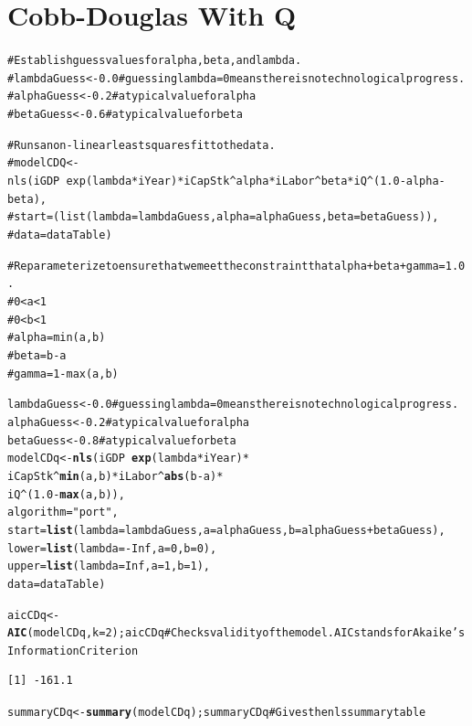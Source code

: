\documentclass[preprint,authoryear,12pt]{elsarticle}\usepackage{graphicx, color}
\makeatletter
\newcommand{\hlfunctioncall}[1]{\textcolor[rgb]{0.501960784313725,0,0.329411764705882}{\textbf{#1}}}%
\newcommand{\hlstring}[1]{\textcolor[rgb]{0.6,0.6,1}{#1}}%
\newcommand{\hlcomment}[1]{\textcolor[rgb]{0.180392156862745,0.6,0.341176470588235}{#1}}%
\newenvironment{kframe}{%
 \def\at@end@of@kframe{}%
 \ifinner\ifhmode%
  \def\at@end@of@kframe{\end{minipage}}%
  \begin{minipage}{\columnwidth}%
 \fi\fi%
 \def\FrameCommand##1{\hskip\@totalleftmargin \hskip-\fboxsep
 \colorbox{shadecolor}{##1}\hskip-\fboxsep
     \hskip-\linewidth \hskip-\@totalleftmargin \hskip\columnwidth}%
 \MakeFramed {\advance\hsize-\width
   \@totalleftmargin\z@ \linewidth\hsize
   \@setminipage}}%
 {\par\unskip\endMakeFramed%
 \at@end@of@kframe}
\newenvironment{knitrout}{}{} %
\makeatother
\begin{document}
\section{Cobb-Douglas With Q}

\begin{knitrout}
\color{fgcolor}\begin{kframe}
\begin{alltt}
\hlcomment{# Establish guess values for alpha, beta, and lambda.}
\hlcomment{# lambdaGuess <- 0.0 # guessing lambda = 0 means there is no technological progress.}
\hlcomment{# alphaGuess <- 0.2 # a typical value for alpha}
\hlcomment{# betaGuess <- 0.6 # a typical value for beta}

\hlcomment{# Runs a non-linear least squares fit to the data.}
\hlcomment{# modelCDQ <- nls(iGDP ~ exp(lambda*iYear) * iCapStk^alpha * iLabor^beta * iQ^(1.0 - alpha - beta), }
\hlcomment{#                 start=(list(lambda=lambdaGuess,alpha=alphaGuess,beta=betaGuess)),}
\hlcomment{#                 data=dataTable)}

\hlcomment{# Reparameterize to ensure that we meet the constraint that alpha + beta + gamma = 1.0.}
\hlcomment{# 0 < a < 1}
\hlcomment{# 0 < b < 1}
\hlcomment{# alpha = min(a, b)}
\hlcomment{# beta = b - a}
\hlcomment{# gamma = 1 - max(a, b)}

lambdaGuess <- 0.0 \hlcomment{# guessing lambda = 0 means there is no technological progress.}
alphaGuess <- 0.2 \hlcomment{# a typical value for alpha}
betaGuess <- 0.8 \hlcomment{# a typical value for beta}
modelCDq <- \hlfunctioncall{nls}(iGDP ~ \hlfunctioncall{exp}(lambda*iYear) * 
                            iCapStk^\hlfunctioncall{min}(a,b) * iLabor^\hlfunctioncall{abs}(b-a) * 
                            iQ^(1.0 - \hlfunctioncall{max}(a,b)), 
  algorithm = \hlstring{"port"},
  start = \hlfunctioncall{list}(lambda=lambdaGuess, a=alphaGuess, b=alphaGuess+betaGuess),
	lower = \hlfunctioncall{list}(lambda=-Inf, a=0, b=0),
	upper = \hlfunctioncall{list}(lambda=Inf, a=1, b=1),
  data = dataTable)

aicCDq <- \hlfunctioncall{AIC}(modelCDq, k=2); aicCDq \hlcomment{# Checks validity of the model. AIC stands for Akaike's Information Criterion}
\end{alltt}
\begin{verbatim}
[1] -161.1
\end{verbatim}
\begin{alltt}

summaryCDq <- \hlfunctioncall{summary}(modelCDq); summaryCDq \hlcomment{# Gives the nls summary table}
\end{alltt}
\begin{verbatim}


\end{verbatim}
\end{kframe}
\end{knitrout}
\end{document}

